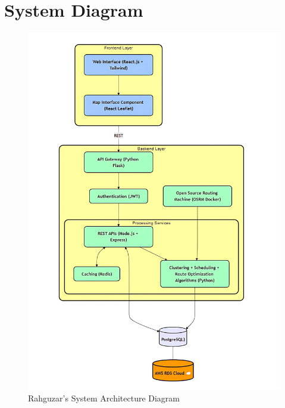 \section{System Diagram}
\begin{center}
        \begin{figure}[H]
        \centering
        \includegraphics[width=\textwidth]{images/Rahguzar - High Level System Diagram.png} 
        \caption{Rahguzar's System Architecture Diagram}
    \end{figure}
\end{center}